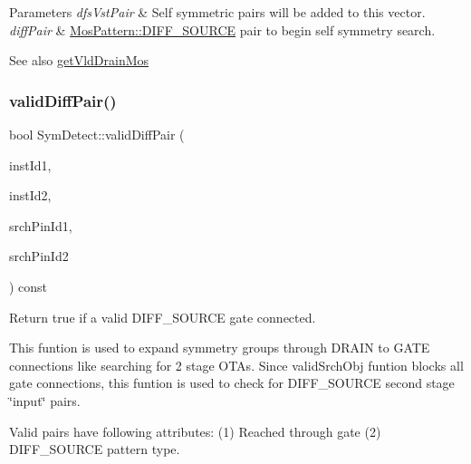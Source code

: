 \begin{DoxyParams}{Parameters}
{\em dfs\+Vst\+Pair} & Self symmetric pairs will be added to this vector. \\
\hline
{\em diff\+Pair} & \hyperlink{type_8h_af19eddb079bfea723256710b029c38e8ad45b64a7d6b85dde1b52dd5a18863933}{Mos\+Pattern\+::\+D\+I\+F\+F\+\_\+\+S\+O\+U\+R\+CE} pair to begin self symmetry search.\\
\hline
\end{DoxyParams}
\begin{DoxySeeAlso}{See also}
\hyperlink{classSymDetect_a48c23173bf5e56c3aa11ac306715cba2}{get\+Vld\+Drain\+Mos} 
\end{DoxySeeAlso}
\mbox{\label{classSymDetect_a1153c5f98df1f6dde97ed3335367bb66}} 
\subsubsection{\texorpdfstring{valid\+Diff\+Pair()}{validDiffPair()}}
{\footnotesize\ttfamily bool Sym\+Detect\+::valid\+Diff\+Pair (\begin{DoxyParamCaption}\item[{\hyperlink{type_8h_a581e8093e28e7362f2b6937296190676}{Index\+Type}}]{inst\+Id1,  }\item[{\hyperlink{type_8h_a581e8093e28e7362f2b6937296190676}{Index\+Type}}]{inst\+Id2,  }\item[{\hyperlink{type_8h_a581e8093e28e7362f2b6937296190676}{Index\+Type}}]{srch\+Pin\+Id1,  }\item[{\hyperlink{type_8h_a581e8093e28e7362f2b6937296190676}{Index\+Type}}]{srch\+Pin\+Id2 }\end{DoxyParamCaption}) const\hspace{0.3cm}{\ttfamily [private]}}



Return true if a valid D\+I\+F\+F\+\_\+\+S\+O\+U\+R\+CE gate connected. 

This funtion is used to expand symmetry groups through D\+R\+A\+IN to G\+A\+TE connections like searching for 2 stage O\+T\+As. Since valid\+Srch\+Obj funtion blocks all gate connections, this funtion is used to check for D\+I\+F\+F\+\_\+\+S\+O\+U\+R\+CE second stage \char`\"{}input\char`\"{} pairs.

Valid pairs have following attributes\+: (1) Reached through gate (2) D\+I\+F\+F\+\_\+\+S\+O\+U\+R\+CE pattern type.

